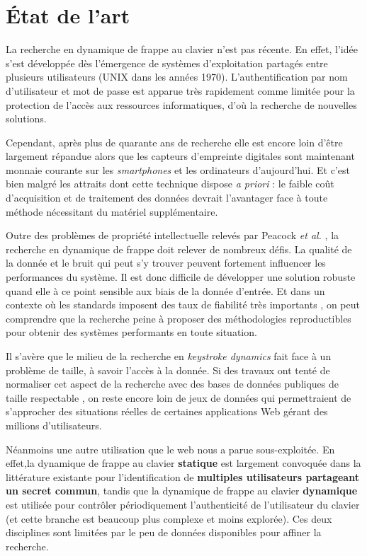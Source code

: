 \section{État de l'art}

La recherche en dynamique de frappe au clavier n'est pas récente\cite{wood1977}. En effet, l'idée s'est développée dès l'émergence de systèmes d'exploitation partagés entre plusieurs utilisateurs (UNIX dans les années 1970). L'authentification par nom d'utilisateur et mot de passe est apparue très rapidement comme limitée pour la protection de l'accès aux ressources informatiques, d'où la recherche de nouvelles solutions.

Cependant, après plus de quarante ans de recherche elle est encore loin d'être largement répandue alors que les capteurs d'empreinte digitales sont maintenant monnaie courante sur les \textit{smartphones} et les ordinateurs d'aujourd'hui. Et c'est bien malgré les attraits dont cette technique dispose \textit{a priori} : le faible coût d'acquisition et de traitement des données devrait l'avantager face à toute méthode nécessitant du matériel supplémentaire.

Outre des problèmes de propriété intellectuelle relevés par Peacock \textit{et al.} \cite{peacock2004}, la recherche en dynamique de frappe doit relever de nombreux défis. La qualité de la donnée et le bruit qui peut s'y trouver peuvent fortement influencer les performances du système. Il est donc difficile de développer une solution robuste quand elle à ce point sensible aux biais de la donnée d'entrée. Et dans un contexte où les standards imposent des taux de fiabilité très importants \cite{killourhy2009}, on peut comprendre que la recherche peine à proposer des méthodologies reproductibles pour obtenir des systèmes performants en toute situation.

Il s'avère que le milieu de la recherche en \textit{keystroke dynamics} fait face à un problème de taille, à savoir l'accès à la donnée. Si des travaux ont tenté de normaliser cet aspect de la recherche avec des bases de données publiques de taille respectable \cite{giotGREYC,killourhy2009}, on reste encore loin de jeux de données qui permettraient de s'approcher des situations réelles de certaines applications Web gérant des millions d'utilisateurs.

Néanmoins une autre utilisation que le web nous a parue sous-exploitée. En effet,la dynamique de frappe au clavier \textbf{statique} est largement convoquée dans la littérature existante pour l'identification de \textbf{multiples utilisateurs partageant un secret commun}, tandis que la dynamique de frappe au clavier \textbf{dynamique} est utilisée pour contrôler périodiquement l'authenticité de l'utilisateur du clavier\cite{gunetti2005} (et cette branche est beaucoup plus complexe et moins explorée). Ces deux disciplines sont limitées par le peu de données disponibles pour affiner la recherche.

